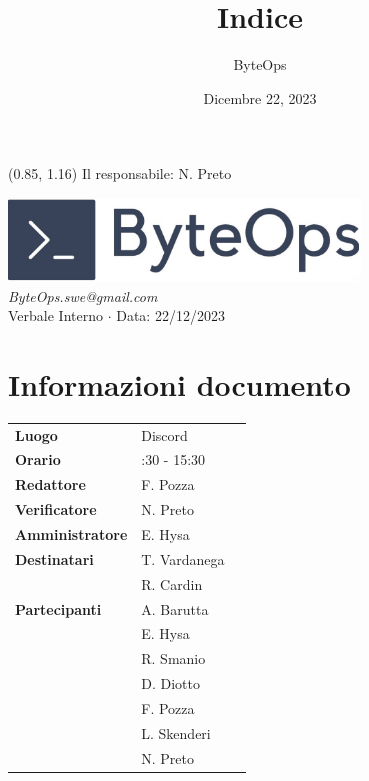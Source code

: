 \documentclass{article}
\title{\textbf{\fontsize{28}{6}\selectfont Indice}}
\author{\fontsize{14}{6}\selectfont ByteOps}
\date{Dicembre 22, 2023}
\begin{document}
\begin{textblock*}{\textwidth}(0.85\textwidth, 1.16\textheight)
    Il responsabile: N. Preto
\end{textblock*}

\pagestyle{fancy}
\begin{center}
\includegraphics[width = 0.7\textwidth]{../../Images/logo.png} \\
\vspace{0.2cm}
\textcolor[RGB]{60, 60, 60}{\textit{ByteOps.swe@gmail.com}} \\
\vspace{1cm}
\fontsize{16}{6}\selectfont Verbale Interno $\cdot$ Data: 22/12/2023 \\
\vspace{0.5cm}
\end{center}

\section*{Informazioni documento}
\def\arraystretch{1.2}
\begin{tabular}{>{\raggedleft\arraybackslash}p{}|>{\raggedright\arraybackslash}p{}c}
\hline
\addlinespace
\textbf{Luogo} & Discord \vspace{10pt} \\
\textbf{Orario} & 14:30 - 15:30 \vspace{10pt} \\
\textbf{Redattore} & F. Pozza \vspace{10pt} \\
\textbf{Verificatore} & N. Preto \vspace{10pt} \\
\textbf{Amministratore} & E. Hysa \vspace{10pt} \\
\textbf{Destinatari} & T. Vardanega \\ & R. Cardin \vspace{10pt} \\
\textbf{Partecipanti} & A. Barutta \\ & E. Hysa \\ & R. Smanio \\ & D. Diotto \\ & F. Pozza \\ & L. Skenderi \\ & N. Preto \vspace{10pt} \\
\end{tabular}
\pagebreak 
\end{document}
